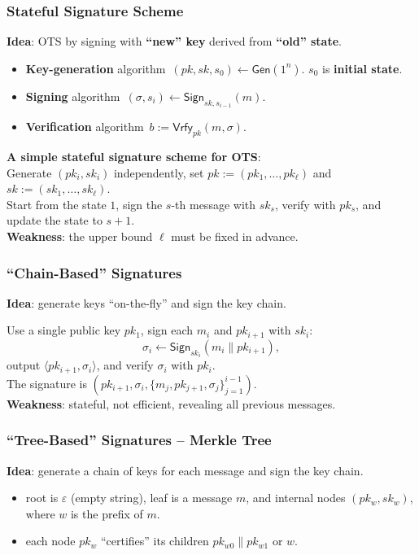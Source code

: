 \begin{frame}\frametitle{Stateful Signature Scheme}
\textbf{Idea}: OTS by signing with \textbf{``new'' key} derived from \textbf{``old'' state}. 
\begin{definition}
\begin{itemize}
\item \textbf{Key-generation} algorithm~$(pk,sk,s_0) \gets \mathsf{Gen}(1^n)$. $s_0$ is \textbf{initial state}.
\item \textbf{Signing} algorithm~$(\sigma,s_i) \gets \mathsf{Sign}_{sk,s_{i-1}}(m)$.
\item \textbf{Verification} algorithm~$b:= \mathsf{Vrfy}_{pk}(m,\sigma)$.
\end{itemize}
\end{definition}
\textbf{A simple stateful signature scheme for OTS}:\\
Generate $(pk_i,sk_i)$ independently, set $pk := (pk_1,\dotsc,pk_{\ell})$ and $sk := (sk_1,\dotsc,sk_{\ell})$. \\
Start from the state $1$, sign the $s$-th message with $sk_s$, verify with $pk_s$, and update the state to $s+1$.\\
\textbf{Weakness}: the upper bound $\ell$ must be fixed in advance.
\end{frame}
\begin{frame}\frametitle{``Chain-Based'' Signatures}
\textbf{Idea}: generate keys ``on-the-fly'' and sign the key chain.
\begin{figure}
\begin{center}

\end{center}
\end{figure}
Use a single public key $pk_1$, sign each $m_i$ and $pk_{i+1}$ with $sk_i$: \[\sigma_i \gets \mathsf{Sign}_{sk_i}(m_i\| pk_{i+1}),\] output $\langle pk_{i+1},\sigma_i \rangle$, and verify $\sigma_i$ with $pk_i$.\\
The signature is $(pk_{i+1},\sigma_i,\{m_j,pk_{j+1},\sigma_j\}^{i-1}_{j=1})$.\\
\textbf{Weakness}: stateful, not efficient, revealing all previous messages.
\end{frame}
\begin{frame}\frametitle{``Tree-Based'' Signatures -- Merkle Tree}
\textbf{Idea}: generate a chain of keys for each message and sign the key chain.
\begin{figure}
\begin{center}

\end{center}
\end{figure}
\begin{itemize}
\item root is $\varepsilon$ (empty string), leaf is a message $m$, and internal nodes $(pk_w,sk_w)$, where $w$ is the prefix of $m$.
\item each node $pk_w$ ``certifies'' its children $pk_{w0}\| pk_{w1}$ or $w$.
\end{itemize}
\end{frame}
